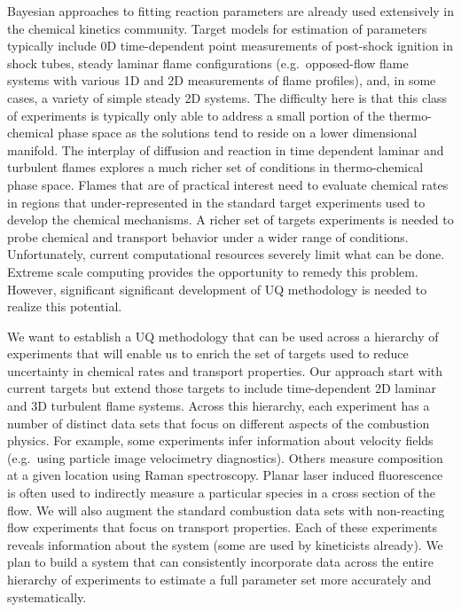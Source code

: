 \documentclass[11pt]{article}
\newcommand{\MarginPar}[1]{\marginpar{%
\vskip-\baselineskip %
\raggedright\tiny\sffamily
\hrule\smallskip{\color{red}#1}\par\smallskip\hrule}}
\begin{document}
Bayesian approaches to fitting reaction parameters are already used
extensively in the chemical kinetics community.
Target models for estimation of parameters typically include
0D time-dependent point measurements of post-shock ignition in shock
tubes, steady laminar flame configurations (e.g.\ opposed-flow flame
systems with various 1D and 2D measurements of flame profiles), and, in some
cases, a variety of simple steady 2D systems.
The difficulty here is that this class of experiments is typically only able to
address a small portion of the thermo-chemical phase space as the solutions tend to 
reside on a lower dimensional manifold. 
\MarginPar{RG: rephrased this - JB  pls check}
The interplay of diffusion and reaction in time dependent laminar and
turbulent flames explores a much richer set of conditions in thermo-chemical
phase space.  Flames that are of practical interest need to evaluate
chemical rates in regions that under-represented in the standard target
experiments used to develop the chemical mechanisms.
A richer set of targets experiments is needed to probe chemical
and transport behavior under a wider range of conditions.
Unfortunately, current computational resources severely limit
what can be done.
Extreme scale computing provides the opportunity to remedy this
problem.
However, significant significant development of UQ methodology is
needed to realize this potential.

We want to establish a UQ methodology that can be used across a
hierarchy of experiments that will enable us to enrich the set
of targets used to reduce uncertainty in chemical rates and transport properties.
Our approach start with current targets
but extend those targets to include
time-dependent 2D laminar and 3D turbulent flame systems.  Across this
hierarchy, each experiment has a number of distinct data sets that
focus on different aspects of the combustion physics.
For example, some
experiments infer information about velocity fields (e.g.\ using
particle image velocimetry diagnostics). Others measure composition at
a given location using Raman spectroscopy.
Planar laser induced
fluorescence is often used to indirectly measure a particular species
in a cross section of the flow.
We will also augment the standard
combustion data sets with non-reacting flow experiments that focus on
transport properties.
Each of these experiments reveals information
about the system (some are used by kineticists already).  We plan to
build a system that can consistently incorporate data across the
entire hierarchy of experiments to estimate a full parameter set more
accurately and systematically.
\end{document}
